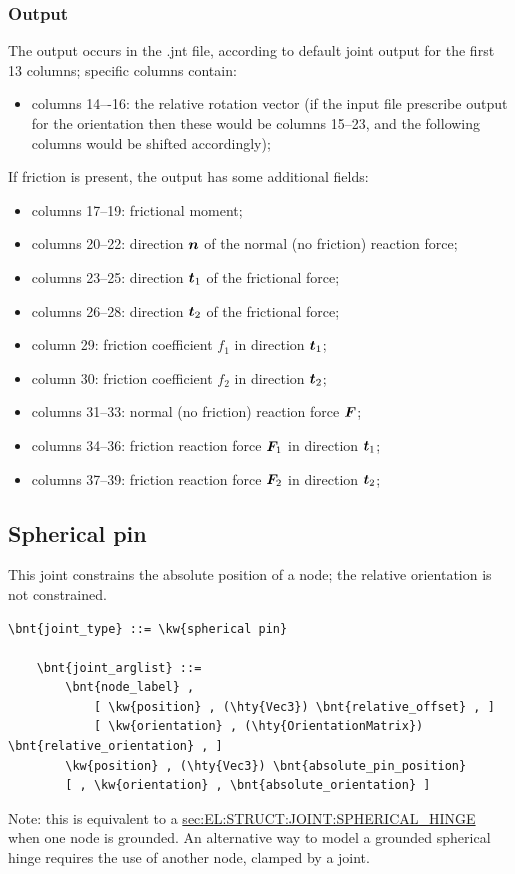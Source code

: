 \subsubsection{Output}
The output occurs in the .jnt file, according to default joint output for the first 13 columns; specific
columns contain:
\begin{itemize}
\item  columns 14–-16: the relative rotation vector (if the input file prescribe  output for the orientation then these would be columns 15--23, and the following columns would be shifted accordingly);
\end{itemize}
If friction is present, the output has some additional fields:
\begin{itemize}
\item columns 17--19: frictional moment;
\item columns 20--22: direction $\boldsymbol{n}$ of the normal (no friction) reaction force;
\item columns 23--25: direction $\boldsymbol{t}_1$ of the frictional force;
\item columns 26--28: direction $\boldsymbol{t}_2$ of the frictional force;
\item column 29: friction coefficient $f_1$ in direction $\boldsymbol{t}_1$;
\item column 30: friction coefficient $f_2$ in direction $\boldsymbol{t}_2$;
\item columns 31--33: normal (no friction) reaction force $\boldsymbol{F}$;
\item columns 34--36: friction reaction force $\boldsymbol{F}_1$ in direction $\boldsymbol{t}_1$;
\item columns 37--39: friction reaction force $\boldsymbol{F}_2$ in direction $\boldsymbol{t}_2$;
\end{itemize}



\subsection{Spherical pin}
This joint constrains the absolute position of a node;
the relative orientation is not constrained.
\begin{Verbatim}[commandchars=\\\{\}]
    \bnt{joint_type} ::= \kw{spherical pin}

    \bnt{joint_arglist} ::=
        \bnt{node_label} ,
            [ \kw{position} , (\hty{Vec3}) \bnt{relative_offset} , ]
            [ \kw{orientation} , (\hty{OrientationMatrix}) \bnt{relative_orientation} , ]
        \kw{position} , (\hty{Vec3}) \bnt{absolute_pin_position}
        [ , \kw{orientation} , \bnt{absolute_orientation} ]   
\end{Verbatim}
Note: this is equivalent to a
\hyperref{\kw{spherical hinge}}{\kw{spherical hinge} (see Section~}{)}{sec:EL:STRUCT:JOINT:SPHERICAL_HINGE}
when one node is grounded.
An alternative way to model a grounded spherical hinge requires
the use of another node, clamped by a  joint.




